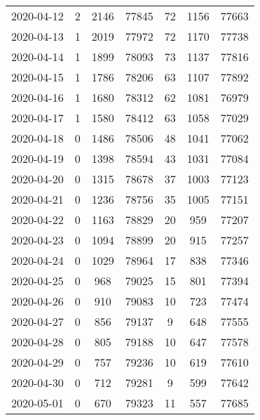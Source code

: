 \begin{longtable}{ccccccc}
2020-04-12&2&2146&77845&72&1156&77663\\
2020-04-13&1&2019&77972&72&1170&77738\\
2020-04-14&1&1899&78093&73&1137&77816\\
2020-04-15&1&1786&78206&63&1107&77892\\
2020-04-16&1&1680&78312&62&1081&76979\\
2020-04-17&1&1580&78412&63&1058&77029\\
2020-04-18&0&1486&78506&48&1041&77062\\
2020-04-19&0&1398&78594&43&1031&77084\\
2020-04-20&0&1315&78678&37&1003&77123\\
2020-04-21&0&1236&78756&35&1005&77151\\
2020-04-22&0&1163&78829&20&959&77207\\
2020-04-23&0&1094&78899&20&915&77257\\
2020-04-24&0&1029&78964&17&838&77346\\
2020-04-25&0&968&79025&15&801&77394\\
2020-04-26&0&910&79083&10&723&77474\\
2020-04-27&0&856&79137&9&648&77555\\
2020-04-28&0&805&79188&10&647&77578\\
2020-04-29&0&757&79236&10&619&77610\\
2020-04-30&0&712&79281&9&599&77642\\
2020-05-01&0&670&79323&11&557&77685\\
\hline
\end{longtable}